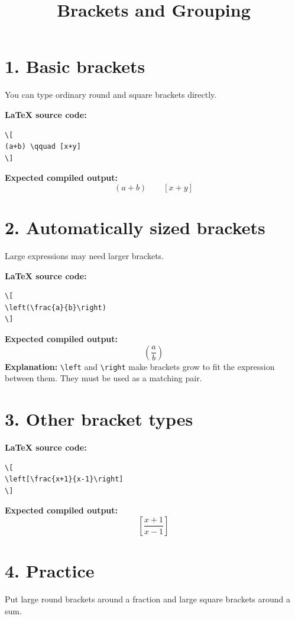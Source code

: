 \documentclass{article}
\title{Brackets and Grouping}
\author{ }
\date{}
\begin{document}
\maketitle

\section*{1. Basic brackets}
You can type ordinary round and square brackets directly.

\textbf{LaTeX source code:}
\begin{verbatim}
\[
(a+b) \qquad [x+y]
\]
\end{verbatim}
\textbf{Expected compiled output:}
\[
(a+b) \qquad [x+y]
\]

\section*{2. Automatically sized brackets}
Large expressions may need larger brackets.

\textbf{LaTeX source code:}
\begin{verbatim}
\[
\left(\frac{a}{b}\right)
\]
\end{verbatim}
\textbf{Expected compiled output:}
\[
\left(\frac{a}{b}\right)
\]
\textbf{Explanation:} \verb|\left| and \verb|\right| make brackets grow to fit the expression between them. They must be used as a matching pair.

\section*{3. Other bracket types}
\textbf{LaTeX source code:}
\begin{verbatim}
\[
\left[\frac{x+1}{x-1}\right]
\]
\end{verbatim}
\textbf{Expected compiled output:}
\[
\left[\frac{x+1}{x-1}\right]
\]

\section*{4. Practice}
Put large round brackets around a fraction and large square brackets around a sum.
\end{document}
